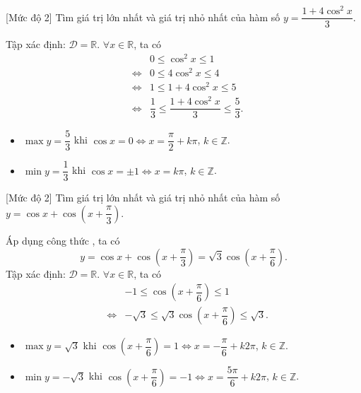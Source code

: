\begin{bt}%
	[Mức độ 2]
	Tìm giá trị lớn nhất và giá trị nhỏ nhất của hàm số $ y=\dfrac{1+4 \cos^2 x}{3} $.
	\loigiai
	{
		Tập xác định: $ \mathscr{D}=\mathbb{R}$. $ \forall x \in \mathbb{R} $, ta có 
		\begin{eqnarray*}
			&& 0\leq \cos^2 x \leq 1\\
			&\Leftrightarrow& 0\leq 4\cos^2 x \leq 4\\
			&\Leftrightarrow& 1\leq 1+4\cos^2 x \leq 5\\
			&\Leftrightarrow& \dfrac{1}{3}\leq \dfrac{1+4\cos^2 x}{3} \leq \dfrac{5}{3}.
		\end{eqnarray*}
	\begin{itemize}
		\item $ \max y=\dfrac{5}{3} $ khi $ \cos x=0 \Leftrightarrow x=\dfrac{\pi}{2}+k\pi$, $k\in \mathbb{Z}$.
		\item $ \min y=\dfrac{1}{3} $ khi $ \cos  x=\pm1 \Leftrightarrow x=k\pi$, $k\in \mathbb{Z}$.
	\end{itemize}
	}
\end{bt}

\begin{bt}%
	[Mức độ 2]
	Tìm giá trị lớn nhất và giá trị nhỏ nhất của hàm số $ y=\cos x+\cos \left(x+\dfrac{\pi}{3}\right) $.
	\loigiai
	{
		Áp dụng công thức , ta có
		\begin{equation*}
			y=\cos x+\cos \left (x+\dfrac{\pi}{3}\right )=\sqrt{3}\cos \left (x+\dfrac{\pi}{6}\right ).
		\end{equation*}
		Tập xác định: $ \mathscr{D}=\mathbb{R}$. $ \forall x \in \mathbb{R} $, ta có
		\begin{eqnarray*}
			&&-1 \leq \cos \left (x+\dfrac{\pi}{6}\right ) \leq 1\\
			&\Leftrightarrow&  -\sqrt{3} \leq \sqrt{3}\cos \left (x+\dfrac{\pi}{6}\right ) \leq \sqrt{3}.
		\end{eqnarray*}
	\begin{itemize}
		\item $ \max y=\sqrt{3} $ khi $ \cos \left (x+\dfrac{\pi}{6}\right ) =1 \Leftrightarrow x=-\dfrac{\pi}{6}+k2\pi$, $k\in \mathbb{Z}$.
		\item $ \min y=-\sqrt{3} $ khi $ \cos \left (x+\dfrac{\pi}{6}\right )=-1 \Leftrightarrow x=\dfrac{5\pi}{6}+k2\pi$, $k\in \mathbb{Z}$.
	\end{itemize}
	}
\end{bt}

